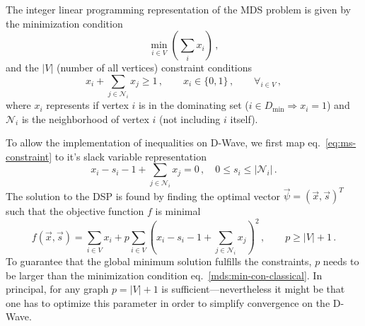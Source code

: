 \documentclass[]{article}
\begin{document}
The integer linear programming representation of the MDS problem is given by the minimization condition
\begin{equation}\label{mds:min-con-classical}
	\min_{i \in V}\left( \sum_i x_i \right)\, ,
\end{equation}
and the $|V|$ (number of all vertices) constraint conditions
\begin{equation}\label{eq:ms-constraint}
	x_i + \sum_{j \in \mathcal N_i} x_j \geq 1 \, , \qquad x_i \in \{ 0, 1\} \, , \qquad \forall_{i \in V} \, ,
\end{equation}
where $x_i$ represents if vertex $i$ is in the dominating set ($i\in D_\text{min} \Rightarrow x_i = 1$) and $\mathcal N_i$ is the neighborhood of vertex $i$ (not including $i$ itself).

To allow the implementation of inequalities on D-Wave, we first map eq.~\eqref{eq:ms-constraint} to it's slack variable representation
\begin{equation}\label{mds:con-slack-classical}
	x_i  - s_{i} - 1 + \sum_{j \in \mathcal{N}_i} x_j = 0 \, , \quad 0 \leq s_{i} \leq |\mathcal{N}_i| \, .
\end{equation}
The solution to the DSP is found by finding the optimal vector $\vec \psi = (\vec x, \vec s)^T$ such that the objective function $f$ is minimal
\begin{equation}\label{mds:objective-function}
	f(\vec x, \vec s)
	=
	\sum_{i\in V} x_i
	+ p \sum_{i \in V} \left(x_i  - s_{i} - 1  + \sum_{j \in\mathcal{N}_i} x_j\right)^2
	\, ,
	\qquad
	p \geq |V| + 1 \, .
\end{equation}
To guarantee that the global minimum solution fulfills the constraints, $p$ needs to be larger than the minimization condition eq.~\eqref{mds:min-con-classical}.
In principal, for any graph $p = |V| + 1$ is sufficient---nevertheless it might be that one has to optimize this parameter in order to simplify convergence on the D-Wave.
\end{document}

